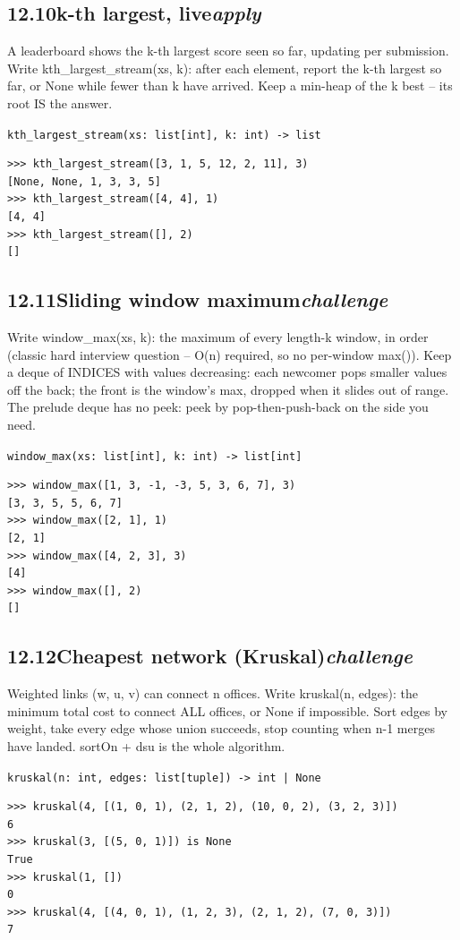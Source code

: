 \documentclass[10pt,letterpaper]{book}
\begin{document}
\subsection*{12.10\quad k-th largest, live\hfill\textnormal{\textit{apply}}}
A leaderboard shows the k-th largest score seen so far, updating per submission. Write kth\_largest\_stream(xs, k): after each element, report the k-th largest so far, or None while fewer than k have arrived. Keep a min-heap of the k best -- its root IS the answer.

\noindent\texttt{kth\_largest\_stream(xs: list[int], k: int) -> list}
\begin{lstlisting}[style=ex]
>>> kth_largest_stream([3, 1, 5, 12, 2, 11], 3)
[None, None, 1, 3, 3, 5]
>>> kth_largest_stream([4, 4], 1)
[4, 4]
>>> kth_largest_stream([], 2)
[]
\end{lstlisting}
\subsection*{12.11\quad Sliding window maximum\hfill\textnormal{\textit{challenge}}}
Write window\_max(xs, k): the maximum of every length-k window, in order (classic hard interview question -- O(n) required, so no per-window max()). Keep a deque of INDICES with values decreasing: each newcomer pops smaller values off the back; the front is the window's max, dropped when it slides out of range. The prelude deque has no peek: peek by pop-then-push-back on the side you need.

\noindent\texttt{window\_max(xs: list[int], k: int) -> list[int]}
\begin{lstlisting}[style=ex]
>>> window_max([1, 3, -1, -3, 5, 3, 6, 7], 3)
[3, 3, 5, 5, 6, 7]
>>> window_max([2, 1], 1)
[2, 1]
>>> window_max([4, 2, 3], 3)
[4]
>>> window_max([], 2)
[]
\end{lstlisting}
\subsection*{12.12\quad Cheapest network (Kruskal)\hfill\textnormal{\textit{challenge}}}
Weighted links (w, u, v) can connect n offices. Write kruskal(n, edges): the minimum total cost to connect ALL offices, or None if impossible. Sort edges by weight, take every edge whose union succeeds, stop counting when n-1 merges have landed. sortOn + dsu is the whole algorithm.

\noindent\texttt{kruskal(n: int, edges: list[tuple]) -> int | None}
\begin{lstlisting}[style=ex]
>>> kruskal(4, [(1, 0, 1), (2, 1, 2), (10, 0, 2), (3, 2, 3)])
6
>>> kruskal(3, [(5, 0, 1)]) is None
True
>>> kruskal(1, [])
0
>>> kruskal(4, [(4, 0, 1), (1, 2, 3), (2, 1, 2), (7, 0, 3)])
7
\end{lstlisting}
\clearpage
\end{document}
